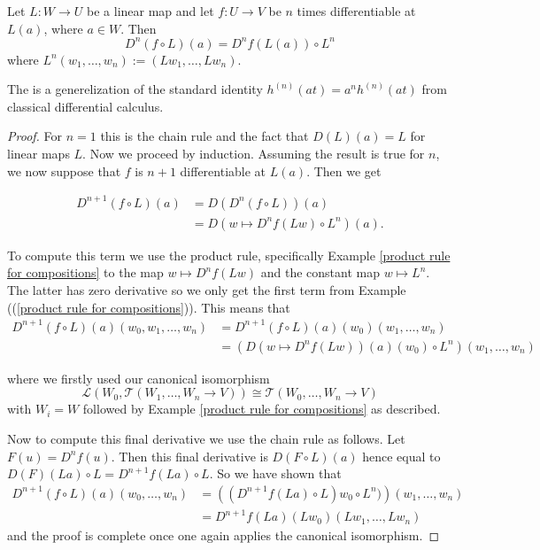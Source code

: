 \documentclass[twoside, a4paper, 10pt]{amsart}
\begin{document}
\begin{lemma}\label{lemma: iterated linear chain rule}  Let $L: W \to U$ be a linear map and let $f:U \to V$ be $n$ times differentiable at $L(a)$, where $a \in W$. Then $$D^n(f \circ L)(a) = D^nf (L(a)) \circ  L^n$$ where $L^n(w_1, \ldots, w_n) := (Lw_1, \ldots, Lw_n)$. \end{lemma}

\begin{remark} The is a generelization of the standard identity $h^{(n)}(at) = a^n h^{(n)}(at)$ from classical differential calculus. \end{remark}

\begin{proof} For $n=1$ this is the chain rule and the fact that $D(L)(a)=L$ for linear maps $L$. Now we proceed by induction. Assuming the result is true for $n$, we now suppose that $f$ is $n+1$ differentiable at $L(a)$. Then we get

\begin{align*} D^{n+1}(f \circ L)(a)  &= D(D^n(f \circ L))(a) \\ &= D( w \mapsto D^n f(Lw)  \circ L^n)(a). \end{align*} 

To compute this term we use the product rule, specifically Example \ref{product rule for compositions} to the map $w \mapsto D^nf(Lw)$ and the constant map $w \mapsto L^n$. The latter has zero derivative so we only get the first term from Example ((\ref{product rule for compositions})). This means that \begin{align*} D^{n+1}(f \circ L)(a) (w_0, w_1, \ldots, w_n) &= D^{n+1}(f \circ L)(a)(w_0) (w_1, \ldots, w_n) \\ &=( D( w \mapsto D^nf(Lw)) (a) (w_0) \circ L^n ) (w_1, \ldots, w_n) \end{align*}

where we firstly used our canonical isomorphism  $$\mathcal{L}(W_0, \mathcal{T}(W_1, \ldots, W_n \to V)) \cong \mathcal{T}(W_0, \ldots, W_n \to V)$$ with $W_i = W$ followed by Example \ref{product rule for compositions} as described.

 Now to compute this final derivative we use the chain rule as follows. Let $F(u) = D^nf(u)$. Then this final derivative is $D(F \circ L) (a)$ hence equal to $D(F)(La) \circ L= D^{n+1}f(La) \circ L$. So we have shown that \begin{align*} D^{n+1}(f \circ L)(a)(w_0, \ldots, w_n) &= \left((D^{n+1}f(La) \circ L)w_0 \circ L^n) \right) (w_1, \ldots, w_n) \\ &= D^{n+1}f(La) (Lw_0) (Lw_1, \ldots, Lw_n) \end{align*} and the proof is complete once one again applies the canonical isomorphism.
\end{proof}
\end{document}
